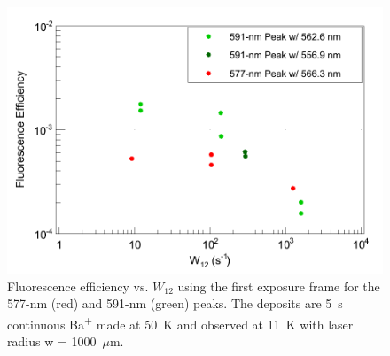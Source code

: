 \begin{figure} %
        \centering
                \includegraphics[width=.7\textwidth]{figures/QE_new_just1000.png}
                \caption{Fluorescence efficiency vs. $W_{12}$ using the first exposure frame for the 577-nm (red) and 591-nm (green) peaks.  The deposits are 5~s continuous Ba\textsuperscript{+} made at 50~K and observed at 11~K with laser radius w = 1000~$\mu$m.}
\label{fig:qe}
\end{figure}





